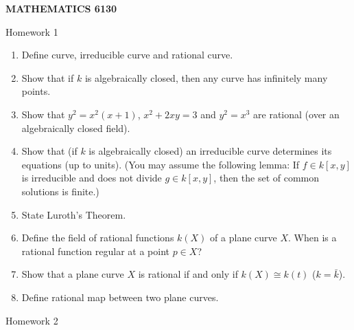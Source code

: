 \documentclass[12pt]{amsart}
\begin{document}
\bigskip\bigskip\bigskip\bigskip
\centerline{\bf MATHEMATICS 6130}
\centerline{Homework 1}
\begin{enumerate}
\item Define curve, irreducible curve and rational curve.

\item Show that if $k$ is algebraically closed, then any curve has infinitely many points.

\item Show that $y^2=x^2(x+1)$, $x^2+2xy=3$ and $y^2=x^3$ are rational (over an algebraically closed field).

\item Show that (if $k$ is algebraically closed) an irreducible curve determines its equations (up to units). (You may assume the following lemma: If $f\in k[x,y] $ is irreducible and does not divide $g\in k[x,y] $, then the set of common solutions is finite.)

\item State Luroth's Theorem.

\item Define the field of rational functions $k(X)$ of a plane curve $X$. When is a rational function regular at a point $p\in X$?

\item Show that a plane curve $X$ is rational if and only if $k(X)\cong k(t)$ ($k=\bar k$).

\item Define rational map between two plane curves.
\end{enumerate}
\centerline{Homework 2}
\end{document}
